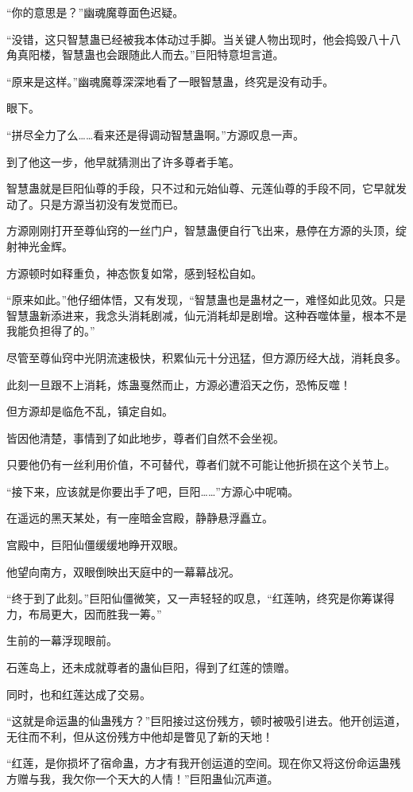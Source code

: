\begin{this_body}
“你的意思是？”幽魂魔尊面色迟疑。

“没错，这只智慧蛊已经被我本体动过手脚。当关键人物出现时，他会捣毁八十八角真阳楼，智慧蛊也会跟随此人而去。”巨阳特意坦言道。

“原来是这样。”幽魂魔尊深深地看了一眼智慧蛊，终究是没有动手。

眼下。

“拼尽全力了么……看来还是得调动智慧蛊啊。”方源叹息一声。

到了他这一步，他早就猜测出了许多尊者手笔。

智慧蛊就是巨阳仙尊的手段，只不过和元始仙尊、元莲仙尊的手段不同，它早就发动了。只是方源当初没有发觉而已。

方源刚刚打开至尊仙窍的一丝门户，智慧蛊便自行飞出来，悬停在方源的头顶，绽射神光金辉。

方源顿时如释重负，神态恢复如常，感到轻松自如。

“原来如此。”他仔细体悟，又有发现，“智慧蛊也是蛊材之一，难怪如此见效。只是智慧蛊新添进来，我念头消耗剧减，仙元消耗却是剧增。这种吞噬体量，根本不是我能负担得了的。”

尽管至尊仙窍中光阴流速极快，积累仙元十分迅猛，但方源历经大战，消耗良多。

此刻一旦跟不上消耗，炼蛊戛然而止，方源必遭滔天之伤，恐怖反噬！

但方源却是临危不乱，镇定自如。

皆因他清楚，事情到了如此地步，尊者们自然不会坐视。

只要他仍有一丝利用价值，不可替代，尊者们就不可能让他折损在这个关节上。

“接下来，应该就是你要出手了吧，巨阳……”方源心中呢喃。

在遥远的黑天某处，有一座暗金宫殿，静静悬浮矗立。

宫殿中，巨阳仙僵缓缓地睁开双眼。

他望向南方，双眼倒映出天庭中的一幕幕战况。

“终于到了此刻。”巨阳仙僵微笑，又一声轻轻的叹息，“红莲呐，终究是你筹谋得力，布局更大，因而胜我一筹。”

生前的一幕浮现眼前。

石莲岛上，还未成就尊者的蛊仙巨阳，得到了红莲的馈赠。

同时，也和红莲达成了交易。

“这就是命运蛊的仙蛊残方？”巨阳接过这份残方，顿时被吸引进去。他开创运道，无往而不利，但从这份残方中他却是瞥见了新的天地！

“红莲，是你损坏了宿命蛊，方才有我开创运道的空间。现在你又将这份命运蛊残方赠与我，我欠你一个天大的人情！”巨阳蛊仙沉声道。


\end{this_body}
